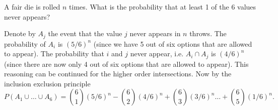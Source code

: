 
\setcounter{theorem}{22}
\begin{exercise}[BH.1.49]
	A fair die is rolled $n$ times. What is the probability that at least 1 of the 6 values never appears?
\begin{solution}
	Denote by $A_{j}$ the event that the value $j$ never appears in $n$ throws. The probability of $A_{i}$ is $(5/6)^n$ (since we have 5 out of six options that are allowed to appear). The probability that $i$ and $j$ never appear, i.e. $A_{i}\cap A_{j}$ is $(4/6)^n$ (since there are now only 4 out of six options that are allowed to appear). This reasoning can be continued for the higher order intersections. Now by the inclusion exclusion principle
	$$P(A_{1}\cup\ldots\cup A_{6}) = {6 \choose 1}(5/6)^n - {6 \choose 2}(4/6)^n + {6\choose 3}(3/6)^n\ldots +{6 \choose 5}(1/6)^n.$$ 
 
\end{solution}
\end{exercise}


